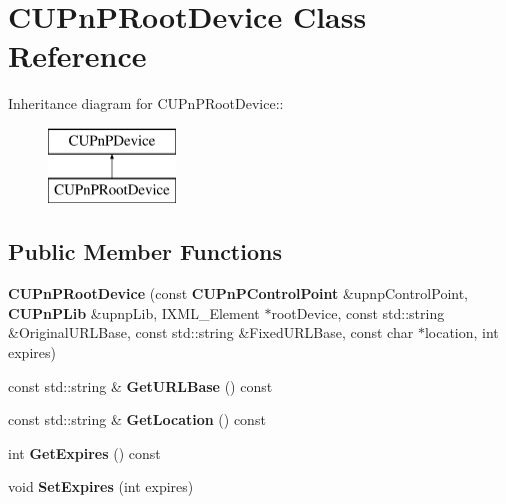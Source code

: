 \section{CUPnPRootDevice Class Reference}
\label{classCUPnPRootDevice}
Inheritance diagram for CUPnPRootDevice::\begin{figure}[H]
\begin{center}
\leavevmode
\includegraphics[height=2cm]{classCUPnPRootDevice}
\end{center}
\end{figure}
\subsection*{Public Member Functions}
\begin{DoxyCompactItemize}
\item 
{\bfseries CUPnPRootDevice} (const {\bf CUPnPControlPoint} \&upnpControlPoint, {\bf CUPnPLib} \&upnpLib, IXML\_\-Element $\ast$rootDevice, const std::string \&OriginalURLBase, const std::string \&FixedURLBase, const char $\ast$location, int expires)\label{classCUPnPRootDevice_a87a11fd02d1ff26728139e4c6735dc81}

\item 
const std::string \& {\bfseries GetURLBase} () const \label{classCUPnPRootDevice_a373e910eb64a49b84096cde3fc77ce5b}

\item 
const std::string \& {\bfseries GetLocation} () const \label{classCUPnPRootDevice_aa9808d89e6420556fbc956589fbdd20d}

\item 
int {\bfseries GetExpires} () const \label{classCUPnPRootDevice_a6442fa657e04fb4bacc54b0d28858c86}

\item 
void {\bfseries SetExpires} (int expires)\label{classCUPnPRootDevice_af3da1759e8d739fcfdcfb66b0cb4750b}

\end{DoxyCompactItemize}
